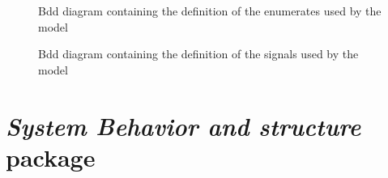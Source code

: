 \documentclass{template/openetcs_report}
\newcommand\packageName[1]{\emph{#1}}
\begin{document}
\begin{figure}[H]
  \centering
  \caption{Bdd diagram containing the definition of the enumerates used by the model}
  \label{fig:Enumerate}
\end{figure}

\begin{figure}[H]
  \centering
  \caption{Bdd diagram containing the definition of the signals used by the model}
  \label{fig:Signals}
\end{figure}

\section{\packageName{System Behavior and structure} package}
\end{document}
